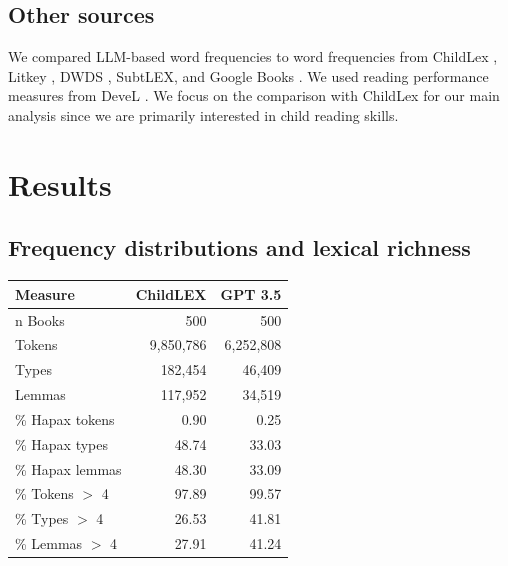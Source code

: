 \documentclass[jou, a4paper]{apa7}
\begin{document}
\subsection*{Other sources}

We compared LLM-based word frequencies to word frequencies from ChildLex \citep{schroeder_childlex_2015}, Litkey \citep{laarmann-quante_litkey_2019}, DWDS \citep{heister_dlexdb_2011}, SubtLEX, and Google Books \citep{brysbaert_impact_2016}. We used reading performance measures from DeveL \citep{schroter_developmental_2017}. We focus on the comparison with ChildLex for our main analysis since we are primarily interested in child reading skills.  


\section{Results}

\subsection*{Frequency distributions and lexical richness}


\begin{table}[ht]
\centering
\begin{tabular}{lrr}
  \hline
Measure & ChildLEX & GPT 3.5 \\ 
  \hline
n Books & 500 & 500 \\ 
  Tokens & 9,850,786 & 6,252,808 \\ 
  Types & 182,454 & 46,409 \\ 
  Lemmas & 117,952 & 34,519 \\ 
  \% Hapax tokens & 0.90 & 0.25 \\ 
  \% Hapax types & 48.74 & 33.03 \\ 
  \% Hapax lemmas & 48.30 & 33.09 \\ 
  \% Tokens $>$ 4 & 97.89 & 99.57 \\ 
  \% Types $>$ 4 & 26.53 & 41.81 \\ 
  \% Lemmas $>$ 4 & 27.91 & 41.24 \\ 
   \hline
\end{tabular}
\end{table}
\end{document}
